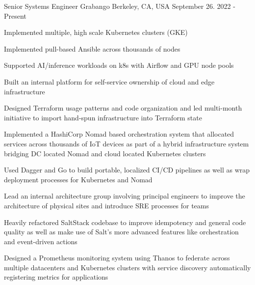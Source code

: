 

\begin{cventries}

  \cventry
    {Senior Systems Engineer} %
    {Grabango} %
    {Berkeley, CA, USA} %
    {September 26. 2022 - Present} %
    {
      \begin{cvitems} %
        \item {Implemented multiple, high scale Kubernetes clusters (GKE)}
        \item {Implemented pull-based Ansible across thousands of nodes}
        \item {Supported AI/inference workloads on k8s with Airflow and GPU node pools}
        \item {Built an internal platform for self-service ownership of cloud and edge infrastructure}
        \item {Designed Terraform usage patterns and code organization and led multi-month initiative to import hand-spun infrastructure into Terraform state}
        \item {Implemented a HashiCorp Nomad based orchestration system that allocated services across thousands of IoT devices as part of a hybrid infrastructure system bridging DC located Nomad and cloud located Kubernetes clusters}
        \item {Used Dagger and Go to build portable, localized CI/CD pipelines as well as wrap deployment processes for Kubernetes and Nomad}
        \item {Lead an internal architecture group involving principal engineers to improve the architecture of physical sites and introduce SRE processes for teams}
        \item {Heavily refactored SaltStack codebase to improve idempotency and general code quality as well as make use of Salt's more advanced features like orchestration and event-driven actions}
        \item {Designed a Prometheus monitoring system using Thanos to federate across multiple datacenters and Kubernetes clusters with service discovery automatically registering metrics for applications}

\end{cvitems}}
\end{cventries}
